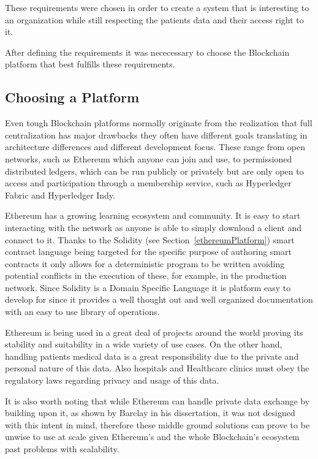 These requirements were chosen in order to create a system that is interesting
to an organization while still respecting the patients data and their access
right to it. 

After defining the requirements it was nececessary to choose the Blockchain
platform that best fulfills these requirements.

\subsection{Choosing a Platform}\label{choosePlatform}

Even tough Blockchain platforms normally originate from the realization that
full centralization has major drawbacks they often have different goals
translating in architecture differences and different development focus.  These
range from open networks, such as Ethereum which anyone can join and use, to
permissioned distributed ledgers, which can be run publicly or privately but
are only open to access and participation through a membership service, such as
Hyperledger Fabric and Hyperledger Indy.

Ethereum has a growing learning ecosystem and community. It is easy to start interacting
with the network as anyone is able to simply download a client and connect to
it. Thanks to the Solidity (see Section~\ref{ethereumPlatform}) smart contract language being targeted for the
specific purpose of authoring smart contracts it only allows for a
deterministic program to be written avoiding potential conflicts in the
execution of these, for example, in the production network. Since Solidity is a Domain Specific Language it is
platform easy to develop for since it provides a well thought out and well
organized documentation with an easy to use library of operations.

Ethereum is being used in a great deal of projects around the world proving its
stability and suitability in a wide variety of use cases. On the other hand,
handling patients medical data is a great responsibility due to the private and
personal nature of this data. Also hospitals and Healthcare clinics must obey
the regulatory laws regarding privacy and usage of this data.

It is also worth noting that while Ethereum can handle private data exchange by
building upon it, as shown by Barclay in his dissertation, it was not designed with this intent in
mind, therefore these middle ground solutions can prove to be unwise to use at
scale given Ethereum's and the whole Blockchain's ecosystem past problems with
scalability.  

